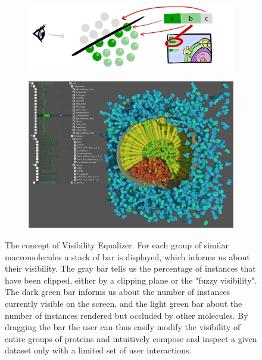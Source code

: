 \begin{figure}
	\centering
	\begin{subfigure}{.5\textwidth}
		\centering
		\includegraphics[width=.99\linewidth]{"graphics/visibility equalizer3"}
		\caption{}
		\label{fig:sub1}
	\end{subfigure}%
	\begin{subfigure}{.5\textwidth}
		\centering
		\includegraphics[width=.99\linewidth]{"graphics/visibility equalizer2"}
		\caption{}
		\label{fig:sub2}
	\end{subfigure}
	\caption{The concept of Visibility Equalizer. For each group of similar macromolecules a stack of bar is displayed,  which informs us about their visibility. 
		The gray bar tells us the percentage of instances that have been clipped, either by a clipping plane or the "fuzzy visibility". The dark green bar informs us about the number of instances currently visible on the screen, and the light green bar about the number of instances rendered but occluded by other molecules. By dragging the bar the user can thus easily modify the visibility of entire groups of proteins and intuitively compose and inspect a given dataset only with a limited set of user interactions.}
	\label{fig:test1}
\end{figure}

